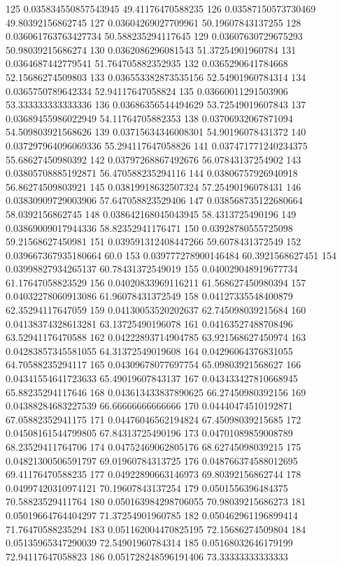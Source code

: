 {125 0.035834550857543945 49.41176470588235
126 0.03587150573730469 49.80392156862745
127 0.03604269027709961 50.19607843137255
128 0.036061763763427734 50.588235294117645
129 0.03607630729675293 50.98039215686274
130 0.0362086296081543 51.37254901960784
131 0.0364687442779541 51.764705882352935
132 0.0365290641784668 52.15686274509803
133 0.036553382873535156 52.54901960784314
134 0.0365750789642334 52.94117647058824
135 0.03660011291503906 53.333333333333336
136 0.03686356544494629 53.72549019607843
137 0.03689455986022949 54.11764705882353
138 0.03706932067871094 54.509803921568626
139 0.03715634346008301 54.90196078431372
140 0.037297964096069336 55.294117647058826
141 0.037471771240234375 55.68627450980392
142 0.03797268867492676 56.07843137254902
143 0.03805708885192871 56.470588235294116
144 0.03806757926940918 56.86274509803921
145 0.03819918632507324 57.25490196078431
146 0.03830909729003906 57.647058823529406
147 0.038568735122680664 58.0392156862745
148 0.038642168045043945 58.4313725490196
149 0.03869009017944336 58.82352941176471
150 0.03928780555725098 59.21568627450981
151 0.039591312408447266 59.6078431372549
152 0.039667367935180664 60.0
153 0.039777278900146484 60.3921568627451
154 0.03998827934265137 60.78431372549019
155 0.040029048919677734 61.17647058823529
156 0.04020833969116211 61.568627450980394
157 0.04032278060913086 61.96078431372549
158 0.04127335548400879 62.35294117647059
159 0.04130053520202637 62.745098039215684
160 0.04138374328613281 63.13725490196078
161 0.04163527488708496 63.52941176470588
162 0.04222893714904785 63.921568627450974
163 0.04283857345581055 64.31372549019608
164 0.04296064376831055 64.70588235294117
165 0.04309678077697754 65.09803921568627
166 0.04341554641723633 65.49019607843137
167 0.043433427810668945 65.88235294117646
168 0.043613433837890625 66.27450980392156
169 0.04388284683227539 66.66666666666666
170 0.04440474510192871 67.05882352941175
171 0.04476046562194824 67.45098039215685
172 0.04508161544799805 67.84313725490196
173 0.04701089859008789 68.23529411764706
174 0.04752469062805176 68.62745098039215
175 0.04821300506591797 69.01960784313725
176 0.048766374588012695 69.41176470588235
177 0.04922890663146973 69.80392156862744
178 0.04997420310974121 70.19607843137254
179 0.0501556396484375 70.58823529411764
180 0.050163984298706055 70.98039215686273
181 0.05019664764404297 71.37254901960785
182 0.050462961196899414 71.76470588235294
183 0.051162004470825195 72.15686274509804
184 0.05135965347290039 72.54901960784314
185 0.05168032646179199 72.94117647058823
186 0.051728248596191406 73.33333333333333
}
